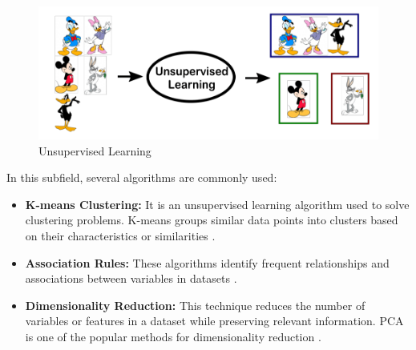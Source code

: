 \begin{figure}[ht!]
	\centering
	\includegraphics[scale=0.6]{Chap1/images/regressionVSclassification2}
	\caption{Unsupervised Learning \cite{ismaili2019}}
	\label{fig:regressionVSclassification2}
\end{figure}

In this subfield, several algorithms are commonly used:
\begin{itemize}
	\item \textbf{K-means Clustering:} It is an unsupervised learning algorithm used to solve clustering problems. K-means groups similar data points into clusters based on their characteristics or similarities \cite{pelleg1999accelerating}.
	\item \textbf{Association Rules:} These algorithms identify frequent relationships and associations between variables in datasets \cite{kamsu2013mining}.
	\item \textbf{Dimensionality Reduction:} This technique reduces the number of variables or features in a dataset while preserving relevant information. PCA is one of the popular methods for dimensionality reduction \cite{pelleg1999accelerating}.
\end{itemize}



